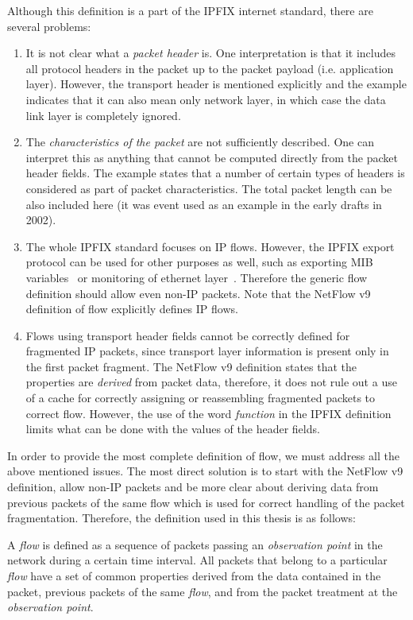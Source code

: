 Although this definition is a part of the IPFIX internet standard, there are several problems:
\begin{enumerate}
	\item It is not clear what a \emph{packet header} is. One interpretation is that it includes all protocol headers in the packet up to the packet payload (i.e. application layer). However, the transport header is mentioned explicitly and the example indicates that it can also mean only network layer, in which case the data link layer is completely ignored.
	\item The \emph{characteristics of the packet} are not sufficiently described. One can interpret this as anything that cannot be computed directly from the packet header fields. The example states that a number of certain types of headers is considered as part of packet characteristics. The total packet length can be also included here (it was event used as an example in the early drafts in 2002).
	\item The whole IPFIX standard focuses on IP flows. However, the IPFIX export protocol can be used for other purposes as well, such as exporting MIB variables~\cite{rfc6615} or monitoring of ethernet layer~\cite{Hofstede-2011-Flow}. Therefore the generic flow definition should allow even non-IP packets. Note that the NetFlow v9 definition of flow explicitly defines IP flows.
	\item Flows using transport header fields cannot be correctly defined for fragmented IP packets, since transport layer information is present only in the first packet fragment. The NetFlow v9 definition states that the properties are \emph{derived} from packet data, therefore, it does not rule out a use of a cache for correctly assigning or reassembling fragmented packets to correct flow. However, the use of the word \emph{function} in the IPFIX definition limits what can be done with the values of the header fields.
\end{enumerate}

In order to provide the most complete definition of flow, we must address all the above mentioned issues. The most direct solution is to start with the NetFlow v9 definition, allow non-IP packets and be more clear about deriving data from previous packets of the same flow which is used for correct handling of the packet fragmentation. Therefore, the definition used in this thesis is as follows:

\begin{definition}\label{def:flow}

    A \emph{flow} is defined as a sequence of packets passing an \emph{observation point}
    in the network during a certain time interval. All packets that belong
    to a particular \emph{flow} have a set of common properties derived from
    the data contained in the packet, previous packets of the same \emph{flow},
    and from the packet treatment at the \emph{observation point}.

\end{definition}

